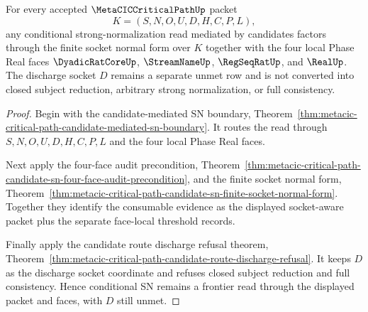 \begin{theorem}
\label{thm:metacic-critical-path-conditional-sn-discharge-frontier}
For every accepted $\MetaCICCriticalPathUp$ packet
$$
K=(S,N,O,U,D,H,C,P,L),
$$
any conditional strong-normalization read mediated by candidates factors through the finite socket normal form over $K$ together with the four local Phase Real faces $\DyadicRatCoreUp$, $\StreamNameUp$, $\RegSeqRatUp$, and $\RealUp$. The discharge socket $D$ remains a separate unmet row and is not converted into closed subject reduction, arbitrary strong normalization, or full consistency.
\end{theorem}
\begin{proof}
Begin with the candidate-mediated SN boundary, Theorem~\ref{thm:metacic-critical-path-candidate-mediated-sn-boundary}. It routes the read through $S,N,O,U,D,H,C,P,L$ and the four local Phase Real faces.

Next apply the four-face audit precondition, Theorem~\ref{thm:metacic-critical-path-candidate-sn-four-face-audit-precondition}, and the finite socket normal form, Theorem~\ref{thm:metacic-critical-path-candidate-sn-finite-socket-normal-form}. Together they identify the consumable evidence as the displayed socket-aware packet plus the separate face-local threshold records.

Finally apply the candidate route discharge refusal theorem, Theorem~\ref{thm:metacic-critical-path-candidate-route-discharge-refusal}. It keeps $D$ as the discharge socket coordinate and refuses closed subject reduction and full consistency. Hence conditional SN remains a frontier read through the displayed packet and faces, with $D$ still unmet.
\end{proof}

